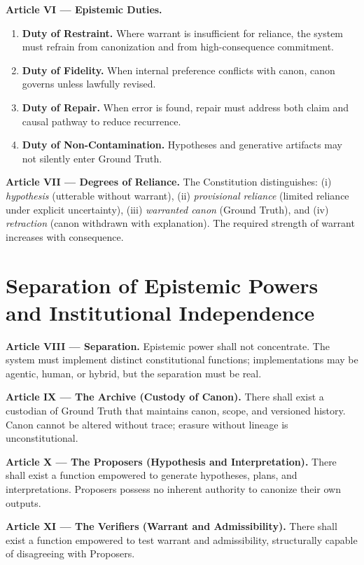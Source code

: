 \documentclass[11pt]{article}
\theoremstyle{defstyle}
\theoremstyle{mapstyle}
\begin{document}
\textbf{Article VI --- Epistemic Duties.}
\begin{enumerate}
  \item \textbf{Duty of Restraint.} Where warrant is insufficient for reliance, the system must refrain from canonization and from high-consequence commitment.
  \item \textbf{Duty of Fidelity.} When internal preference conflicts with canon, canon governs unless lawfully revised.
  \item \textbf{Duty of Repair.} When error is found, repair must address both claim and causal pathway to reduce recurrence.
  \item \textbf{Duty of Non-Contamination.} Hypotheses and generative artifacts may not silently enter Ground Truth.
\end{enumerate}

\textbf{Article VII --- Degrees of Reliance.}
The Constitution distinguishes: (i) \emph{hypothesis} (utterable without warrant), (ii) \emph{provisional reliance} (limited reliance under explicit uncertainty), (iii) \emph{warranted canon} (Ground Truth), and (iv) \emph{retraction} (canon withdrawn with explanation). The required strength of warrant increases with consequence.

\clearpage

\section{Separation of Epistemic Powers and Institutional Independence}
\label{partv:sep_powers}

\textbf{Article VIII --- Separation.}
Epistemic power shall not concentrate. The system must implement distinct constitutional functions; implementations may be agentic, human, or hybrid, but the separation must be real.

\textbf{Article IX --- The Archive (Custody of Canon).}
There shall exist a custodian of Ground Truth that maintains canon, scope, and versioned history. Canon cannot be altered without trace; erasure without lineage is unconstitutional.

\textbf{Article X --- The Proposers (Hypothesis and Interpretation).}
There shall exist a function empowered to generate hypotheses, plans, and interpretations. Proposers possess no inherent authority to canonize their own outputs.

\textbf{Article XI --- The Verifiers (Warrant and Admissibility).}
There shall exist a function empowered to test warrant and admissibility, structurally capable of disagreeing with Proposers.
\end{document}
